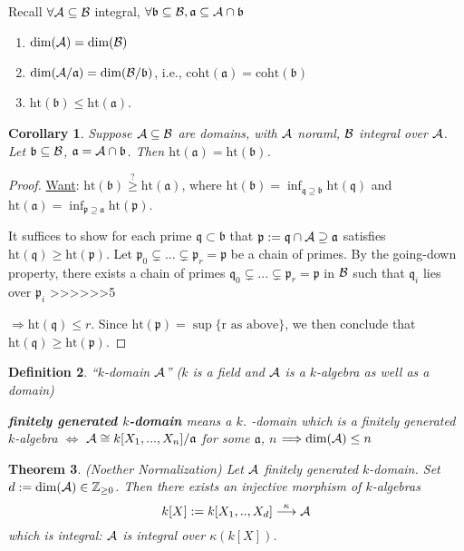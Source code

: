 \documentclass[11pt]{article}
\newtheorem{thm}{Theorem}[section]
\newtheorem{cor}[thm]{Corollary}
\newtheorem{dfn}[thm]{Definition}
\newcommand{\intg}{\mathbb Z}
\newcommand{\sca}{{\mathfrak a}}
\newcommand{\scb}{{\mathfrak b}}
\newcommand{\scp}{{\mathfrak p}}
\newcommand{\scq}{\mathfrak q}
\newcommand{\cala}{{\cal A}}
\newcommand{\calb}{{\cal B}}
\newcommand{\Lrta}{\Longrightarrow}
\newcommand{\lrta}{\longrightarrow}
\newcommand{\Llrta}{\Longleftrightarrow}
\begin{document}
Recall $\forall \cala\subseteq \calb$ integral, $\forall \scb\subseteq \calb,\sca\subseteq \cala\cap \scb$
\begin{enumerate}[label=(\roman*)]
\item $\text{dim}(\cala)=\text{dim}(\calb)$
\item $\text{dim}(\cala/\sca)=\text{dim}(\calb/\scb)$, i.e., $
\text{coht}(\sca)=\text{coht}(\scb)$
\item $\text{ht}(\scb)\leq \text{ht}(\sca)$.
\end{enumerate}
\begin{cor}
Suppose $\cala\subseteq \calb$ are domains, with $\cala$ noraml, $\calb$ integral over $\cala$. Let $\scb\subseteq \calb$, $\sca=\cala\cap \scb$. Then $\text{ht}(\sca)=\text{ht}(\scb)$.
\end{cor}
\begin{proof}
\underline{Want}: $\text{ht}(\scb)\overset{?}{\geq} \text{ht}(\sca)$, where $\text{ht}(\scb)=\inf_{\scq\supseteq \scb} \text{ht}(\scq)$ and  $\text{ht}(\sca)=\inf_{\scp\supseteq \sca} \text{ht}(\scp)$.

It suffices to show for each prime $\scq\subset\scb$ that $\scp:=\scq\cap \cala\supseteq \sca$ satisfies $\text{ht}(\scq)\geq \text{ht}(\scp)$. Let $\scp_0\subsetneq ...\subsetneq \scp_r=\scp$ be a chain of primes. By the going-down property, there exists a chain of primes $\scq_0\subsetneq ...\subsetneq \scp_r=\scp$ in $\calb$ such that $\scq_i$ lies over $\scp_i$
>>>>>>5

$\Lrta \text{ht}(\scq)\leq r$. Since $\text{ht}(\scp)=\sup\{\text{r as above}\}$, we then conclude that $\text{ht}(\scq)\geq \text{ht}(\scp)$.
\end{proof}

\begin{dfn}
``$k$-domain $\cala$'' ($k$ is a field and $\cala$ is a $k$-algebra as well as a domain)

\textbf{finitely generated $k$-domain} means a $k$.
-domain which is a finitely generated $k$-algebra
$\Llrta$ $\cala\cong k[X_1,...,X_n]/\sca$ for some $\sca$, $n$ $\Lrta \text{dim}(\cala)\leq n$
\end{dfn}

\begin{thm}\label{thm:Noether_Normalization}(Noether Normalization)
Let $\cala$ finitely generated $k$-domain. Set $d:=\text{dim}(\cala)\in \intg_{\geq 0}$. Then there exists an injective morphism of $k$-algebras
$$
k[X]:=k[X_1,..,X_d]\overset{\kappa}{\lrta} \cala
$$
which is integral: $\cala$ is integral over $\kappa(k[X])$.
\end{thm}
\end{document}
